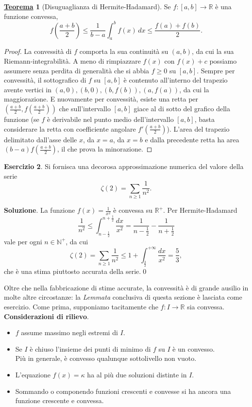 \documentclass[a4paper,twoside]{article}
\newcommand{\R}{\mathbb{R}}
\theoremstyle{definition}
\newtheorem{theorem}{\color{Red}\underline{\textrm Teorema}}
\newtheorem{ex}[theorem]{Esercizio}
\numberwithin{theorem}{section}
\begin{document}
\begin{theorem}[Disuguaglianza di Hermite-Hadamard]\label{HermiteHadamard}
Se $f:[a,b]\to\mathbb{R}$ è una funzione convessa,
$$ f\left(\frac{a+b}{2}\right) \leq \frac{1}{b-a}\int_{a}^{b}f(x)\,dx \leq \frac{f(a)+f(b)}{2}.$$
\end{theorem}
\begin{proof} La convessità di $f$ comporta la sua continuità su $(a,b)$, da cui la sua Riemann-integrabilità. A meno di rimpiazzare $f(x)$ con $f(x)+c$ possiamo assumere senza perdita di generalità che si abbia $f\geq 0$ su $[a,b]$. Sempre per convessità, il sottografico di $f$ su $[a,b]$ è contenuto all'interno del trapezio avente vertici in $(a,0),(b,0),(b,f(b)),(a,f(a))$, da cui la maggiorazione.
E nuovamente per convessità, esiste una retta per $\left(\frac{a+b}{2},f\left(\frac{a+b}{2}\right)\right)$ che sull'intervallo $[a,b]$ giace al di sotto del grafico della funzione (se $f$ è derivabile nel punto medio dell'intervallo $[a,b]$, basta considerare la retta con coefficiente angolare $f'\left(\frac{a+b}{2}\right)$). L'area del trapezio delimitato dall'asse delle $x$, da $x=a$, da $x=b$ e dalla precedente retta ha area $(b-a)f\left(\frac{a+b}{2}\right)$, il che prova la minorazione.\end{proof}


\begin{ex} Si fornisca una decorosa approssimazione numerica del valore della serie $$\zeta(2)=\sum_{n\geq 1}\frac{1}{n^2}.$$
\end{ex}

\textbf{Soluzione}. La funzione $f(x)=\frac{1}{x^2}$ è convessa su $\mathbb{R}^+$. Per Hermite-Hadamard
$$ \frac{1}{n^2}\leq \int_{n-\frac{1}{2}}^{n+\frac{1}{2}}\frac{dx}{x^2}=\frac{1}{n-\frac{1}{2}}-\frac{1}{n+\frac{1}{2}} $$
vale per ogni $n\in\mathbb{N}^+$, da cui
$$\zeta(2)=\sum_{n\geq 1}\frac{1}{n^2}\leq 1+\int_{\frac{3}{2}}^{+\infty}\frac{dx}{x^2}=\frac{5}{3}, $$
che è una stima piuttosto accurata della serie.\qed



Oltre che nella fabbricazione di stime accurate, la convessità è di grande ausilio in molte altre circostanze: la \emph{Lemmata} conclusiva di questa sezione è lasciata come esercizio. Come prima, supponiamo tacitamente che $f:I\to\R$ sia convessa.\\



\textbf{Considerazioni di rilievo}. 
\begin{itemize}
 \item $f$ assume massimo negli estremi di $I$.
 \item Se $I$ è chiuso l'insieme dei punti di minimo di $f$ su $I$ è un convesso.\\ Più in generale, è convesso qualunque sottolivello non vuoto.
 \item L'equazione $f(x)=\kappa$ ha al più due soluzioni distinte in $I$.
 \item Sommando o componendo funzioni crescenti e convesse si ha ancora una funzione crescente e convessa.
\end{itemize}
\end{document}
